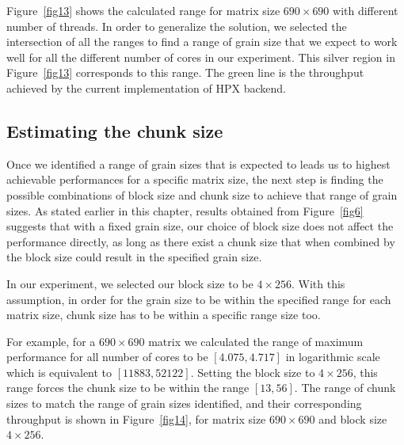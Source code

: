 Figure~\ref{fig13} shows the calculated range for matrix size $690\times690$ with different number of threads. In order to generalize the solution, we selected the intersection of all the ranges to find a range of grain size that we expect to work well for all the different number of cores in our experiment. This silver region in Figure~\ref{fig13} corresponds to this range. The green line is the throughput achieved by the current implementation of HPX backend. 
\vspace{\baselineskip}	

\subsection{Estimating the chunk size}
Once we identified a range of grain sizes that is expected to leads us to highest achievable performances for a specific matrix size, the next step is finding the possible combinations of block size and chunk size to achieve that range of grain sizes.  
As stated earlier in this chapter, results obtained from Figure~\ref{fig6} suggests that with a fixed grain size, our choice of block size does not affect the performance directly, as long as there exist a chunk size that when combined by the block size could result in the specified grain size. 

In our experiment, we selected our block size to be $4\times256$. With this assumption, in order for the grain size to be within the specified range for each matrix size, chunk size has to be within a specific range size too.

For example, for a $690\times690$ matrix we calculated the range of maximum performance for all number of cores to be $[4.075, 4.717]$ in logarithmic scale which is equivalent to $[11883, 52122]$. Setting the block size to $4\times256$, this range forces the chunk size to be within the range $[13,56]$. The range of chunk sizes to match the range of grain sizes identified, and their corresponding throughput is shown in Figure~\ref{fig14}, for matrix size $690\times690$ and block size $4\times256$.


